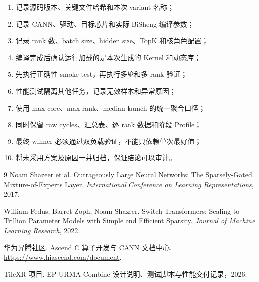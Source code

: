 \documentclass[UTF8,a4paper,11pt]{ctexart}
\begin{document}
\begin{enumerate}
  \item 记录源码版本、关键文件哈希和本次 variant 名称；
  \item 记录 CANN、驱动、目标芯片和实际 BiSheng 编译参数；
  \item 记录 rank 数、batch size、hidden size、TopK 和核角色配置；
  \item 编译完成后确认运行加载的是本次生成的 Kernel 和动态库；
  \item 先执行正确性 smoke test，再执行多轮和多 rank 验证；
  \item 性能测试隔离其他任务，记录无效样本和异常原因；
  \item 使用 max-core、max-rank、median-launch 的统一聚合口径；
  \item 同时保留 raw cycles、汇总表、逐 rank 数据和阶段 Profile；
  \item 最终 winner 必须通过双负载验证，不能只依赖单次最好值；
  \item 将未采用方案及原因一并归档，保证结论可以审计。
\end{enumerate}

\begin{thebibliography}{9}
  Noam Shazeer et al.
  \newblock Outrageously Large Neural Networks: The Sparsely-Gated Mixture-of-Experts Layer.
  \newblock \emph{International Conference on Learning Representations}, 2017.

  William Fedus, Barret Zoph, Noam Shazeer.
  \newblock Switch Transformers: Scaling to Trillion Parameter Models with Simple and Efficient Sparsity.
  \newblock \emph{Journal of Machine Learning Research}, 2022.

  华为昇腾社区.
  \newblock Ascend C 算子开发与 CANN 文档中心.
  \newblock \url{https://www.hiascend.com/document}.

  TileXR 项目.
  \newblock EP URMA Combine 设计说明、测试脚本与性能交付记录，2026.
\end{thebibliography}
\end{document}
